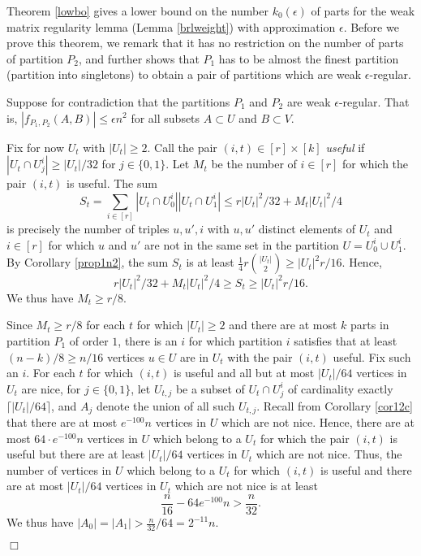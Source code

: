 \documentclass[11pt]{article}
\newenvironment{proof}
      {\medskip\noindent{\bf Proof:}\hspace{1mm}}
      {\hfill$\Box$\medskip}
\begin{document}
Theorem \ref{lowbo} gives a lower bound on the number $k_0(\epsilon)$ of parts
for the weak matrix regularity lemma (Lemma \ref{brlweight}) with approximation
$\epsilon$. Before we prove this theorem, we remark that it has no restriction
on the number of parts of partition $P_2$, and further shows that $P_1$ has to
be almost the finest partition (partition into singletons) to obtain a pair of
partitions which are weak $\epsilon$-regular.

\begin{proof} Suppose for contradiction that the partitions $P_1$ and $P_2$ are
weak $\epsilon$-regular. That is,
$|f_{P_1,P_2}(A,B)| \leq \epsilon n^2$ for all subsets $A \subset U$ and $B
\subset V$.

Fix for now $U_t$ with $|U_t| \geq 2$. Call the pair $(i,t) \in [r] \times [k]$
{\it useful} if $|U_t \cap U_j^i| \geq |U_t|/32$ for $j \in \{0,1\}$. Let
$M_{t}$ be the number of $i \in [r]$ for which the pair $(i,t)$ is useful.
The sum $$S_t=\sum_{i \in [r]}|U_t \cap U_0^i||U_t \cap U_{1}^i| \leq
r|U_t|^2/32+M_t|U_t|^2/4$$ is precisely the number of triples $u,u',i$ with
$u,u'$ distinct elements of $U_t$ and $i \in [r]$ for which $u$ and $u'$ are
not in the same set in the partition $U=U_0^i \cup U_1^i$. By Corollary
\ref{prop1n2}, the sum $S_t$ is at least $\frac{1}{4}r{|U_t| \choose 2} \geq
|U_t|^2 r/16$. Hence, $$r|U_t|^2/32+M_t|U_t|^2/4 \geq S_t \geq |U_t|^2 r /16.$$
We thus have $M_t \geq r/8$.

Since $M_t \geq r/8$ for each $t$ for which $|U_t| \geq 2$ and there are at
most $k$ parts in partition $P_1$ of order $1$, there is an $i$ for which
partition $i$ satisfies that at least $(n-k)/8 \geq n/16$ vertices $u \in U$
are in $U_t$ with the pair $(i,t)$ useful. Fix such an $i$. For each $t$ for
which $(i,t)$ is useful and all but at most $|U_t|/64$ vertices in $U_t$ are
nice, for $j \in \{0,1\}$, let $U_{t,j}$ be a subset of $U_t \cap U_j^i$ of
cardinality exactly $\lceil |U_t|/64 \rceil$, and $A_j$ denote the union of all
such $U_{t,j}$. Recall from Corollary \ref{cor12c} that there are at most
$e^{-100}n$ vertices in $U$ which are not nice. Hence, there are at most $64
\cdot e^{-100}n$ vertices in $U$ which belong to a $U_t$ for which the pair
$(i,t)$ is useful but there are at least $|U_t|/64$ vertices in $U_t$ which are
not nice. Thus, the number of vertices in $U$ which belong to a $U_t$ for which
$(i,t)$ is useful and there are at most $|U_t|/64$ vertices in $U_t$ which are
not nice is at least
$$\frac{n}{16}- 64e^{-100}n > \frac{n}{32}.$$
We thus have $|A_0|=|A_1| > \frac{n}{32}/64=2^{-11}n$.


\end{proof}
\end{document}
